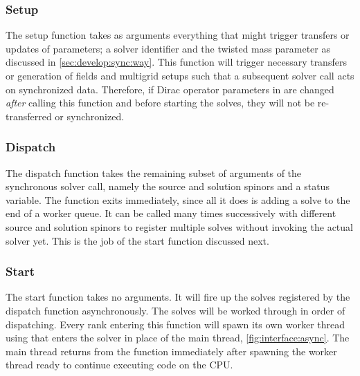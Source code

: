 \subsubsection{Setup}

The setup function  takes as arguments everything that might trigger transfers or updates of parameters; a solver identifier and the twisted mass parameter as discussed in \cref{sec:develop:sync:way}.
This function will trigger necessary transfers or generation of fields and multigrid setups such that a subsequent solver call acts on synchronized data.
Therefore, if Dirac operator parameters in \openqxd are changed \emph{after} calling this function and before starting the solves, they will not be re-transferred or synchronized.

\subsubsection{Dispatch}

The dispatch function  takes the remaining subset of arguments of the synchronous solver call, namely the source and solution spinors and a status variable.
The function exits immediately, since all it does is adding a solve to the end of a worker queue.
It can be called many times successively with different source and solution spinors to register multiple solves without invoking the actual solver yet.
This is the job of the start function discussed next.

\subsubsection{Start}
\label{sec:interface:solver:async:start}

The start function  takes no arguments.
It will fire up the solves registered by the dispatch function asynchronously.
The solves will be worked through in order of dispatching.
Every rank entering this function will spawn its own worker thread using  that enters the \quda solver in place of the main thread, \cref{fig:interface:async}.
The main thread returns from the function immediately after spawning the worker thread ready to continue executing code on the CPU.

